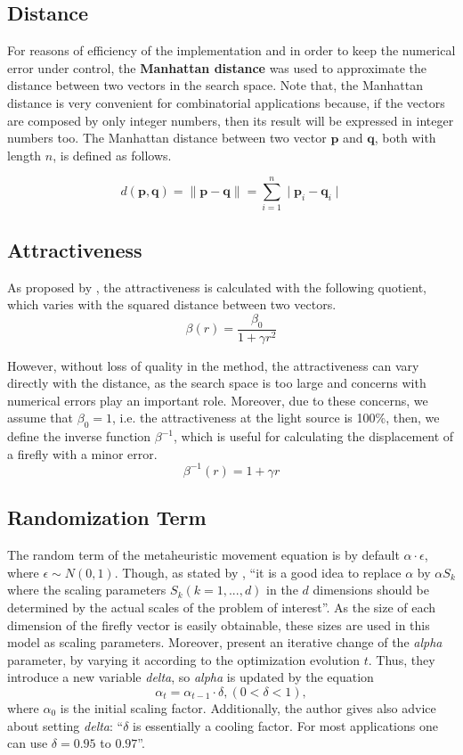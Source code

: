 \documentclass[tuberlin,cic,tc,openright,english,noabntcite,oneside]{iiufrgs}
\begin{document}
\subsection{Distance}
For reasons of efficiency of the implementation and in order to keep the numerical error under control, the \textbf{Manhattan distance} was used to approximate the distance between two vectors in the search space. Note that, the Manhattan distance is very convenient for combinatorial applications because, if the vectors are composed by only integer numbers, then its result will be expressed in integer numbers too. The Manhattan distance between two vector $\mathbf{p}$ and $\mathbf{q}$, both with length $n$, is defined as follows.

$$d(\mathbf{p},\mathbf{q}) = \parallel \mathbf{p} - \mathbf{q} \parallel = \sum_{i=1}^{n} \mid \mathbf{p}_{i}-\mathbf{q}_{i} \mid$$

\subsection{Attractiveness}\label{sec:attractiveness}
As proposed by \textcite[p. 173]{yang_firefly_2009}, the attractiveness is calculated with the following quotient, which varies with the squared distance between two vectors.
$$\beta(r) = \frac{\beta_{0}}{1 + \gamma r^2}$$

However, without loss of quality in the method, the attractiveness can vary directly with the distance, as the search space is too large and concerns with numerical errors play an important role. Moreover, due to these concerns, we assume that $\beta_0 = 1$, i.e. the attractiveness at the light source is 100\%, then, we define the inverse function $\beta^{-1}$, which is useful for calculating the displacement of a firefly with a minor error.
$$\beta^{-1}(r) = 1 + \gamma r$$

\subsection{Randomization Term}\label{sec:random_term}
The random term of the metaheuristic movement equation is by default $\alpha \cdot \epsilon$, where $\epsilon \sim N(0,1)$. Though, as stated by \textcite[p. 80]{yang_firefly_2010}, \enquote{it is a good idea to replace $\alpha$ by $\alpha S_k$ where the scaling parameters $S_k (k=1,...,d)$ in the $d$ dimensions should be determined by the actual scales of the problem of interest}. As the size of each dimension of the firefly vector is easily obtainable, these sizes are used in this model as scaling parameters. Moreover, \textcite[p. 37-38]{yang_firefly_2013} present an iterative change of the \emph{alpha} parameter, by varying it according to the optimization evolution $t$. Thus, they introduce a new variable \emph{delta}, so \emph{alpha} is updated by the equation
$$ \alpha_t = \alpha_{t-1} \cdot \delta, (0 < \delta < 1),$$ where $\alpha_0$ is the initial scaling factor. Additionally, the author gives also advice about setting \emph{delta}: \enquote{$\delta$ is essentially a cooling factor. For most applications one can use $\delta = 0.95$ to $0.97$}.
\end{document}
